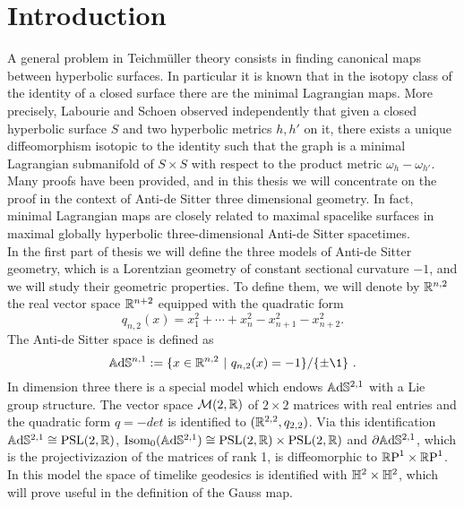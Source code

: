 \chapter*{Introduction}
\noindent A general problem in Teichm\"uller theory consists in finding canonical maps between hyperbolic surfaces. In particular it is known that in the isotopy class of the identity of a closed surface there are the minimal Lagrangian maps. More precisely, Labourie and Schoen observed independently that given a closed hyperbolic surface $S$ and two hyperbolic metrics $h, h'$ on it, there exists a unique diffeomorphism isotopic to the identity such that the graph is a minimal Lagrangian submanifold of $S \times S$ with respect to the product metric $\omega_h - \omega_{h'}$.
Many proofs have been provided, and in this thesis we will concentrate on the proof in the context of Anti-de Sitter three dimensional geometry. In fact, minimal Lagrangian maps are closely related to maximal spacelike surfaces in maximal globally hyperbolic three-dimensional Anti-de Sitter spacetimes. \\

In the first part of thesis we will define the three models of Anti-de Sitter geometry, which is a Lorentzian geometry of constant sectional curvature $-1$, and we will study their geometric properties. To define them, we will denote by $\mathbb{R} ^{n,2}$ the real vector space $\mathbb{R} ^{n+2}$ equipped with the quadratic form
\[
q_{n,2}(x) = x_1^2 + \cdots + x_n^2 - x_{n+1}^2 - x_{n+2}^2.
\]
The Anti-de Sitter space is defined as
\[
\A^{n,1} := \{ x\in \R^{n,2} \ | \ q_{n,2}(x) = -1 \} / \{ \pm \1 \} \ .
\]
In dimension three there is a special model which endows $\mathbb{A}\mathrm{d}\mathbb{S}^{2,1}$ with a Lie group structure.
The vector space $\mathcal{M}(2,\mathbb{R})$ of $2 \times 2$ matrices with real entries and the quadratic form $q= -det$ is identified to $(\mathbb{R}^{2,2},q_{2,2})$. Via this identification $\mathbb{A}\mathrm{d}\mathbb{S}^{2,1} \cong \text{PSL}(2,\mathbb{R})$, $\text{Isom}_0(\mathbb{A}\mathrm{d}\mathbb{S}^{2,1}) \cong \text{PSL}(2,\mathbb{R}) \times \text{PSL}(2,\mathbb{R})$ and $\partial\mathbb{A}\mathrm{d}\mathbb{S}^{2,1}$, which is the projectivizazion of the matrices of rank 1, is diffeomorphic to $\mathbb{R}\textup{P}^1\times\mathbb{R}\textup{P}^1$. In this model the space of timelike geodesics is identified with $\mathbb{H}^2 \times \mathbb{H}^2$, which will prove useful in the definition of the Gauss map.\\

